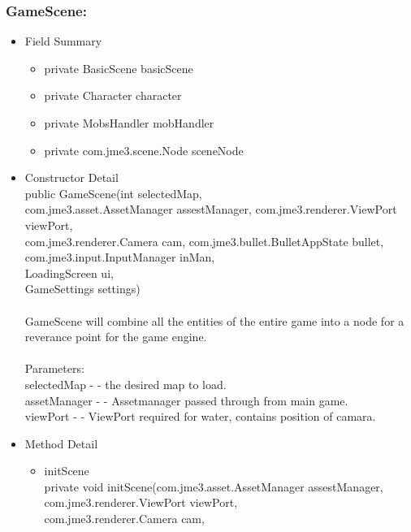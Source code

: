 \documentclass[letterpaper]{article}
\begin{document}
				\subsubsection*{GameScene:}
				\vspace{0.1in}
					\begin{itemize}
						\item	Field Summary
								\begin{itemize}
									\item	private BasicScene	basicScene 
									\item	private Character	character 
									\item	private MobsHandler	mobHandler 
									\item	private com.jme3.scene.Node	sceneNode 
								\end{itemize}
						\item	Constructor Detail \\
								public GameScene(int selectedMap, \\ com.jme3.asset.AssetManager assestManager, com.jme3.renderer.ViewPort viewPort, \\ com.jme3.renderer.Camera cam, com.jme3.bullet.BulletAppState bullet, \\ com.jme3.input.InputManager inMan, \\ LoadingScreen ui, \\ GameSettings settings) \\ \\
								GameScene will combine all the entities of the entire game into a node for a reverance point for the game engine. \\ \\
								Parameters: \\
								selectedMap - - the desired map to load. \\
								assetManager - - Assetmanager passed through from main game. \\
								viewPort - - ViewPort required for water, contains position of camara.
						\item	Method Detail
								\begin{itemize}
									\item	initScene \\
											private void initScene(com.jme3.asset.AssetManager assestManager, \\
		             com.jme3.renderer.ViewPort viewPort, \\
		             com.jme3.renderer.Camera cam, \\

\end{itemize}
\end{itemize}
\end{document}
